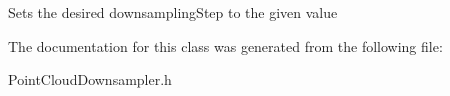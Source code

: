 \label{class_point_cloud_downsampler_aa59d5affe32288f96dd2ac1ff46aab35}
Sets the desired downsamplingStep to the given value 

The documentation for this class was generated from the following file:\begin{DoxyCompactItemize}
\item 
PointCloudDownsampler.h\end{DoxyCompactItemize}
